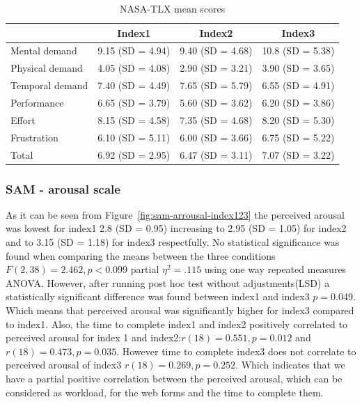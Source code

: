 \documentclass[a4paper]{report}
\begin{document}
				\begin{table}[h]
					\centering
					\caption{NASA-TLX mean scores}
					\label{my-label}
					\begin{tabular}{l|ccc}
						& Index1           & Index2           & Index3           \\[0.12cm]   \hline
						Mental demand   & 9.15 (SD = 4.94) & 9.40 (SD = 4.68) & 10.8 (SD = 5.38) \\
						Physical demand & 4.05 (SD = 4.08) & 2.90 (SD = 3.21) & 3.90 (SD = 3.65) \\
						Temporal demand & 7.40 (SD = 4.49)  & 7.65 (SD = 5.79) & 6.55 (SD = 4.91) \\
						Performance     & 6.65 (SD = 3.79) & 5.60 (SD = 3.62)  & 6.20 (SD = 3.86)  \\
						Effort          & 8.15 (SD = 4.58) & 7.35 (SD = 4.68) & 8.20 (SD = 5.30)   \\
						Frustration     & 6.10 (SD = 5.11)  & 6.00 (SD = 3.66)  & 6.75 (SD = 5.22) \\\hline
						Total 			& 6.92 (SD = 2.95) & 6.47 (SD = 3.11) & 7.07 (SD = 3.22)
					\end{tabular}
				\end{table}
	
			\subsubsection{SAM - arousal scale}
			As it can be seen from Figure~\ref{fig:sam-arrousal-index123} the perceived arousal was lowest for index1 2.8 (SD = 0.95) increasing to 2.95 (SD = 1.05) for index2 and to 3.15 (SD = 1.18) for index3 respectfully. No statistical significance was found when comparing the means between the three conditions $F(2,38)=2.462, p<0.099$ partial $\eta^{2}=.115$ using one way repeated measures ANOVA. However, after running post hoc test without adjustments(LSD) a statistically significant difference was found between index1 and index3 $p=0.049$. Which means that perceived arousal was significantly higher for index3 compared to index1.
			Also, the time to complete index1 and index2 positively correlated to perceived arousal for index 1 and index2:$r(18)=0.551, p=0.012$ and $r(18)=0.473, p=0.035$. However time to complete index3 does not correlate to perceived arousal of index3 $r(18)=0.269, p=0.252$. Which indicates that we have a partial positive correlation between the perceived arousal, which can be considered as workload, for the web forms and the time to complete them.
			
\end{document}
